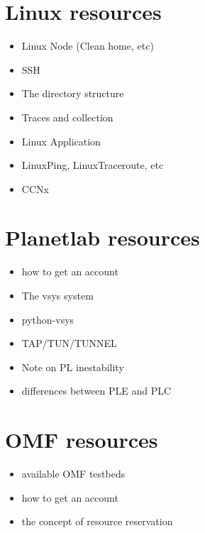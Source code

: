 %
%
%
%
%
%

\section{Linux resources}

\begin{itemize}
  \item Linux Node (Clean home, etc)
  \item SSH
  \item The directory structure
  \item Traces and collection
  \item Linux Application
  \item LinuxPing, LinuxTraceroute, etc
  \item CCNx
\end{itemize}

\section{Planetlab resources}

\begin{itemize}
 \item how to get an account
 \item The vsys system
 \item python-vsys
 \item TAP/TUN/TUNNEL
 \item Note on PL inestability
 \item differences between PLE and PLC
\end{itemize}

\section{OMF resources}

\begin{itemize}
  \item available OMF testbeds
  \item how to get an account
  \item the concept of resource reservation
\end{itemize}
